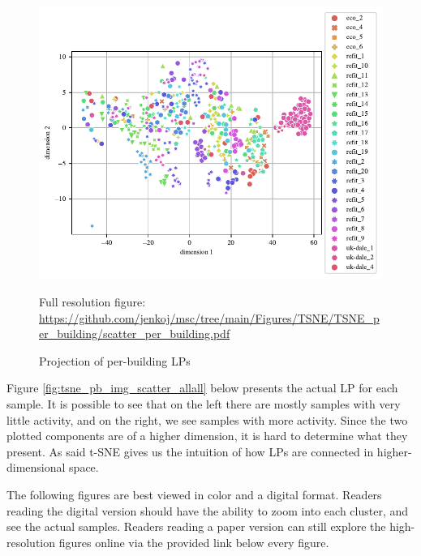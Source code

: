 \begin{figure}[H]
	\centering
	\caption{Projection of per-building LPs}
	\includegraphics[]{Figures/TSNE/TSNE_per_building/scatter_per_building.pdf}
	\label{fig:tsne_scatter_non_norm_all}
	\par
	\par\footnotesize{Full resolution figure: \url{https://github.com/jenkoj/msc/tree/main/Figures/TSNE/TSNE_per_building/scatter_per_building.pdf}}
\end{figure}

Figure \ref{fig:tsne_pb_img_scatter_allall} below presents the actual LP for each sample. 
It is possible to see that on the left there are mostly samples with very little activity,
and on the right, we see samples with more activity.
Since the two plotted components are of a higher dimension, it is hard to determine what they present.
As said t-SNE gives us the intuition of how LPs are connected in higher-dimensional space.

The following figures are best viewed in color and a digital format. 
Readers reading the digital version should have the ability to zoom into each cluster, and see the actual samples. 
Readers reading a paper version can still explore the high-resolution figures online via the provided link below every figure.

